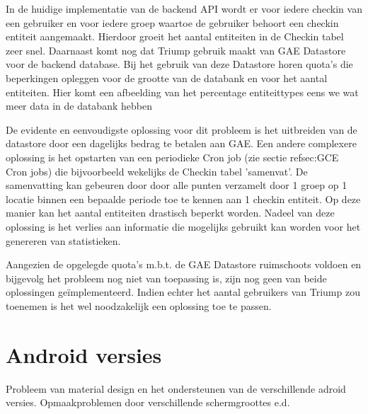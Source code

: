 In de huidige implementatie van de backend API wordt er voor iedere checkin van een gebruiker en voor iedere groep waartoe de gebruiker behoort een checkin entiteit aangemaakt. Hierdoor groeit het aantal entiteiten in de Checkin tabel zeer snel. Daarnaast komt nog dat Triump gebruik maakt van GAE Datastore voor de backend database. Bij het gebruik van deze Datastore horen quota's die beperkingen opleggen voor de grootte van de databank en voor het aantal entiteiten. 
\newline\newline
\HRule 
\newline
Hier komt een afbeelding van het percentage entiteittypes eens we wat meer data in de databank hebben \newline
\HRule
\newline\newline

De evidente en eenvoudigste oplossing voor dit probleem is het uitbreiden van de datastore door een dagelijks bedrag te betalen aan GAE. Een andere complexere oplossing is het opstarten van een periodieke Cron job (zie sectie ref{sec:GCE} Cron jobs) die bijvoorbeeld wekelijks de Checkin tabel 'samenvat'. De samenvatting kan gebeuren door door alle punten verzamelt door 1 groep op 1 locatie binnen een bepaalde periode toe te kennen aan 1 checkin entiteit. Op deze manier kan het aantal entiteiten drastisch beperkt worden. Nadeel van deze oplossing is het verlies aan informatie die mogelijks gebruikt kan worden voor het genereren van statistieken. 

Aangezien de opgelegde quota's m.b.t. de GAE Datastore ruimschoots voldoen en bijgevolg het probleem nog niet van toepassing is, zijn nog geen van beide oplossingen geïmplementeerd.
Indien echter het aantal gebruikers van Triump zou toenemen is het wel noodzakelijk een oplossing toe te passen.

\section{Android versies}

Probleem van material design en het ondersteunen van de verschillende adroid versies. 
Opmaakproblemen door verschillende schermgroottes e.d.




